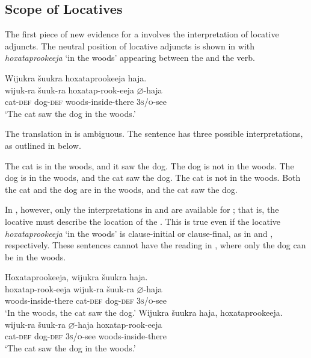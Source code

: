 \documentclass[output=paper]{LSP/langsci}
\begin{document}
\subsection{Scope of Locatives}

The first piece of new evidence for a  involves the interpretation of locative adjuncts. The neutral position of locative adjuncts is shown in  with \textit{hoxataprookeeja} `in the woods' appearing between the  and the verb.

\begin{exe}
\ex\label{ex:jrs:37} 
\glll Wijukra	\v{s}uukra		hoxataprookeeja		haja.\\
wijuk-ra	\v{s}uuk-ra		hoxatap-rook-eeja		$\varnothing$-haja \\
cat-\textsc{def}		dog-\textsc{def} 	woods-inside-there	\textsc{3s/o}-see \\
\trans `The cat saw the dog in the woods.' 
\end{exe}

The translation in  is ambiguous. The  sentence has three possible interpretations, as outlined in  below.

\begin{exe}
\ex\label{ex:jrs:38} 
\begin{xlist}
\ex \label{ex:jrs:38a} The cat is in the woods, and it saw the dog. The dog is not in the woods. 
\ex \label{ex:jrs:38b} The dog is in the woods, and the cat saw the dog. The cat is not in the woods.
\ex \label{ex:jrs:38c}Both the cat and the dog are in the woods, and the cat saw the dog.
\end{xlist}
\end{exe}

In , however, only the interpretations in  and  are available for ; that is, the locative  must describe the location of the . This is true even if the locative \textit{hoxataprookeeja} `in the woods' is clause-initial or clause-final, as in  and  , respectively. These sentences cannot have the reading in , where only the dog can be in the woods.

\begin{exe}
\ex\label{ex:jrs:39}
\begin{xlist}
\ex 
\glll Hoxataprookeeja, 		wijukra	\v{s}uukra			haja.\\
hoxatap-rook-eeja		wijuk-ra	\v{s}uuk-ra		$\varnothing$-haja \\
	woods-inside-there 	cat-\textsc{def}		dog-\textsc{def}		\textsc{3s/o}-see \\
\trans `In the woods, the cat saw the dog.'
\ex 
\glll Wijukra	\v{s}uukra			haja,				hoxataprookeeja.\\
wijuk-ra	\v{s}uuk-ra		$\varnothing$-haja			hoxatap-rook-eeja \\
	cat-\textsc{def}		dog-\textsc{def}		\textsc{3s/o}-see	woods-inside-there \\
\trans `The cat saw the dog in the woods.'
\end{xlist}
\end{exe}
	
\end{document}
